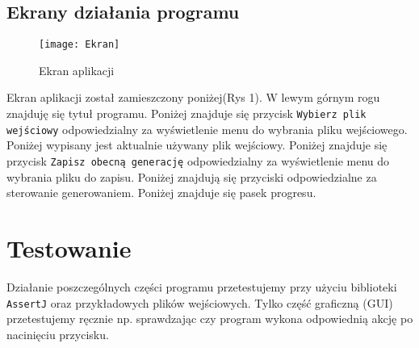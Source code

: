 \documentclass[a4paper,11pt, notitlepage ]{article}
\begin{document}
\subsection{Ekrany działania programu}
\begin{figure}[h]
\centering
\texttt{[image: Ekran]}
\caption{Ekran aplikacji}
\end{figure}
Ekran aplikacji został zamieszczony poniżej(Rys 1). W lewym górnym rogu znajduję się tytuł programu. Poniżej znajduje się przycisk \verb+Wybierz plik+ \verb+wejściowy+ odpowiedzialny za wyświetlenie menu do wybrania pliku wejściowego. Poniżej wypisany jest aktualnie używany plik wejściowy. Poniżej znajduje się przycisk \verb+Zapisz obecną generację+ odpowiedzialny za wyświetlenie menu do wybrania pliku do zapisu. Poniżej znajdują się przyciski odpowiedzialne za sterowanie generowaniem. Poniżej znajduje się pasek progresu.

\section{Testowanie}
Działanie poszczególnych części programu przetestujemy przy użyciu biblioteki \verb+AssertJ+ oraz przykładowych plików wejściowych. Tylko część graficzną (GUI) przetestujemy ręcznie np. sprawdzając czy program wykona odpowiednią akcję po nacinięciu przycisku.
\end{document}
